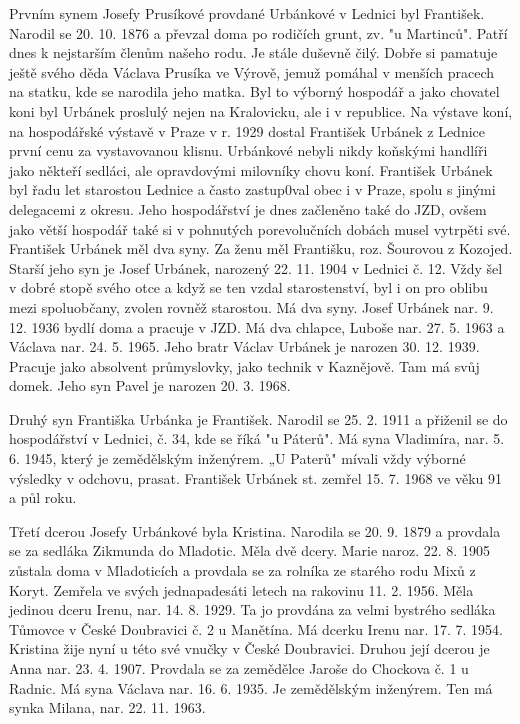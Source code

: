 \documentclass[../dejiny-rodu-prusiku.tex]{subfiles}
\begin{document}
Prvním synem Josefy Prusíkové provdané Urbánkové v Lednici byl František. Narodil se 20. 10. 1876 a převzal doma po rodičích grunt, zv. "u Martinců". Patří dnes k nejstarším členům našeho rodu. Je stále duševně čilý. Dobře si pamatuje ještě svého děda Václava Prusíka ve  Výrově, jemuž pomáhal v menších pracech na statku, kde se narodila jeho matka. Byl to výborný hospodář a ja­ko chovatel koni byl Urbánek proslulý nejen na Kralovicku, ale i v republice. Na výstave koní, na hospo­dářské výstavě v Praze v r. 1929 dostal František Urbánek z Lednice první cenu za vystavovanou klisnu. Urbánkové nebyli nikdy koňskými handlíři jako někteří sedláci, ale opravdovými milovníky chovu koní. František Urbánek byl řadu let starostou Lednice a často zastup0val obec i v Praze, spolu s jinými delegacemi z okresu. Jeho hospodářství je dnes začleněno také do JZD, ovšem jako větší hospodář také si v pohnutých porevolučních dobách musel vytrpěti své. František Urbánek měl dva syny. Za ženu měl Františku, roz. Šourovou z Kozojed. Starší jeho syn je Josef Urbánek, narozený 22. 11. 1904 v Lednici č. 12. Vždy šel v dobré stopě svého otce a když se ten vzdal starostenství, byl i on pro oblibu mezi spoluobčany, zvolen rovněž starostou. Má dva syny. Josef Urbánek nar. 9. 12. 1936 bydlí doma a pracuje v JZD. Má dva chlapce, Luboše nar.  27. 5. 1963 a Václa­va nar. 24. 5. 1965. Jeho bratr Václav Urbánek je na­rozen 30. 12. 1939. Pracuje jako absolvent průmyslovky, jako technik v Kaznějově. Tam má svůj domek. Jeho syn Pavel je narozen 20. 3. 1968.

Druhý syn Františka Urbánka je František. Narodil se 25. 2. 1911 a přiženil se do hospodářství v Lednici, č. 34, kde se říká "u Páterů". Má syna Vladimíra, nar. 5. 6. 1945, který je zemědělským inženýrem. „U Paterů" mívali vždy výborné výsledky v odchovu, prasat. František Urbánek st. zemřel 15. 7. 1968 ve věku 91 a půl roku.

Třetí dcerou Josefy Urbánkové byla Kristina. Narodila se 20. 9. 1879 a provdala se za sedláka Zikmunda do Mladotic. Měla dvě dcery. Marie naroz. 22. 8. 1905 zůstala doma v Mladoticích a provdala se za rolníka ze starého rodu Mixů z Koryt. Zemřela ve svých jednapadesáti letech na rakovinu 11. 2. 1956. Měla jedinou dceru Irenu, nar. 14. 8. 1929. Ta jo provdána za velmi bystrého sedláka Tůmovce v České Doubravici č. 2 u Manětína. Má dcerku Irenu nar. 17. 7. 1954. Kristina žije nyní u této své vnučky v České Doubravici. Druhou její dcerou je Anna nar. 23. 4. 1907. Provdala se za zemědělce Jaroše do Chockova č. 1 u Radnic. Má syna Václava nar. 16. 6. 1935. Je zemědělským inženýrem. Ten má synka Milana, nar. 22. 11. 1963.
\end{document}
